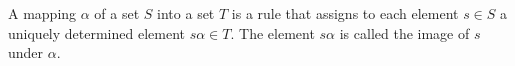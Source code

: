 A mapping $\alpha$ of a set $S$ into a set $T$ is a rule that assigns to each element $s \in S$ a uniquely determined element $s\alpha \in T$. The element $s\alpha$ is called the image of $s$ under $\alpha$.
